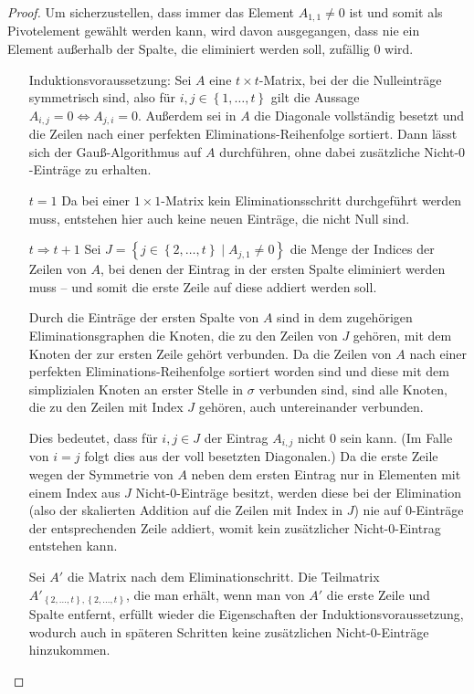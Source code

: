 \begin{proof}
	Um sicherzustellen, dass immer das Element \( A_{1, 1} \neq 0 \) ist und somit als Pivotelement gewählt werden kann, wird davon ausgegangen, dass nie ein Element außerhalb der Spalte, die eliminiert werden soll, zufällig \( 0 \) wird.

	\begin{itemize}
		\item[Induktionsvoraussetzung:]
		      Sei \( A \) eine \( t \times t \)-Matrix, bei der die Nulleinträge symmetrisch sind, also für \( i, j \in \left\lbrace 1, \ldots, t \right\rbrace \) gilt die Aussage \( A_{i,j} = 0 \Leftrightarrow A_{j,i} = 0 \). Außerdem sei in \( A \) die Diagonale vollständig besetzt und die Zeilen nach einer perfekten Eliminations-Reihenfolge sortiert. Dann lässt sich der Gauß-Algorithmus auf \( A \) durchführen, ohne dabei zusätzliche Nicht-\( 0 \)-Einträge zu erhalten.
		\item[\( t = 1 \)]
		      Da bei einer \( 1 \times 1 \)-Matrix kein Eliminationsschritt durchgeführt werden muss, entstehen hier auch keine neuen Einträge, die nicht Null sind.
		\item[\( t \Rightarrow t + 1\)]
		      Sei \( J = \left\lbrace j \in \left\lbrace 2, \ldots, t \right\rbrace \mid A_{j, 1} \neq  0 \right\rbrace \) die Menge der Indices der Zeilen von \( A \), bei denen der Eintrag in der ersten Spalte eliminiert werden muss -- und somit die erste Zeile auf diese addiert werden soll.

		      Durch die Einträge der ersten Spalte von \( A \) sind in dem zugehörigen Eliminationsgraphen die Knoten, die zu den Zeilen von \( J \) gehören, mit dem Knoten der zur ersten Zeile gehört verbunden. Da die Zeilen von \( A \) nach einer perfekten Eliminations-Reihenfolge sortiert worden sind und diese mit dem simplizialen Knoten an erster Stelle in \( \sigma \) verbunden sind, sind alle Knoten, die zu den Zeilen mit Index \( J \) gehören, auch untereinander verbunden.

		      Dies bedeutet, dass für \( i, j \in J \) der Eintrag \( A_{i,j} \) nicht \( 0 \) sein kann. (Im Falle von \( i = j \) folgt dies aus der voll besetzten Diagonalen.) Da die erste Zeile wegen der Symmetrie von \( A \) neben dem ersten Eintrag nur in Elementen mit einem Index aus \( J \) Nicht-\( 0 \)-Einträge besitzt, werden diese bei der Elimination (also der skalierten Addition auf die Zeilen mit Index in \( J \)) nie auf \( 0 \)-Einträge der entsprechenden Zeile addiert, womit kein zusätzlicher Nicht-\( 0 \)-Eintrag entstehen kann.

		      Sei \(A'\) die Matrix nach dem Eliminationschritt. Die Teilmatrix \( A'_{\left\lbrace 2, \ldots, t\right\rbrace, \left\lbrace 2, \ldots, t\right\rbrace} \), die man erhält, wenn man von \( A' \) die erste Zeile und Spalte entfernt, erfüllt wieder die Eigenschaften der Induktionsvoraussetzung, wodurch auch in späteren Schritten keine zusätzlichen Nicht-\( 0 \)-Einträge hinzukommen.
	\end{itemize}
\end{proof}